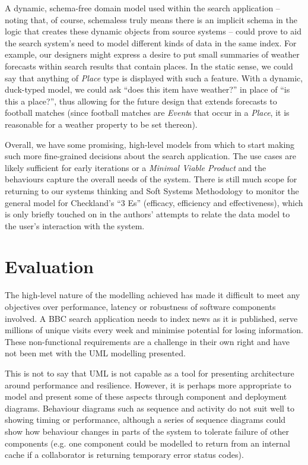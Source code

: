 \documentclass{llncs}
\begin{document}
A dynamic, schema-free domain model used within the search application
-- noting that, of course, schemaless truly means there is an
implicit schema in the logic that creates these dynamic objects from
source systems\cite{sadalage2012nosql} -- could prove to aid the
search system's need to model different kinds of data in the same
index. For example, our designers might express a desire to put
small summaries of weather forecasts within search results that
contain places. In the static sense, we could say that anything
of \emph{Place} type is displayed with such a feature. With
a dynamic, duck-typed model, we could ask
``does this item have weather?'' in place of ``is this a place?'', thus
allowing for the future design that extends forecasts to football
matches (since football matches are \emph{Event}s that occur in
a \emph{Place}, it is reasonable for a weather property to be
set thereon).

Overall, we have some promising, high-level models from which to
start making such more fine-grained decisions about the search
application. The use cases are likely sufficient for early iterations
or a \emph{Minimal Viable Product}\cite{junk2000dynamic} and
the behaviours capture the overall needs of the system. There is still
much scope for returning to our systems thinking and Soft Systems
Methodology to monitor the general model for Checkland's ``3 Es''
(efficacy, efficiency and effectiveness)\cite{checkland1990soft},
which is only briefly touched on in the authors' attempts to relate the
data model to the user's interaction with the system.

\section{Evaluation}
\label{evaluation}

The high-level nature of the modelling achieved has made it
difficult to meet any objectives over performance, latency or
robustness of software components involved. A BBC search application
needs to index news as it is published, serve millions of unique
visits every week and minimise potential for losing information. These
non-functional requirements are a challenge in their own right
and have not been met with the UML modelling presented.

This is not to say that UML is not capable as a tool for presenting
architecture around performance and resilience. However, it is perhaps
more appropriate to model and present some of these aspects through
component and deployment diagrams. Behaviour diagrams such as sequence
and activity do not suit well to showing timing or performance, although
a series of sequence diagrams could show how behaviour changes
in parts of the system to tolerate failure of other components (e.g.
one component could be modelled to return from an internal cache if
a collaborator is returning temporary error status codes).
\end{document}
